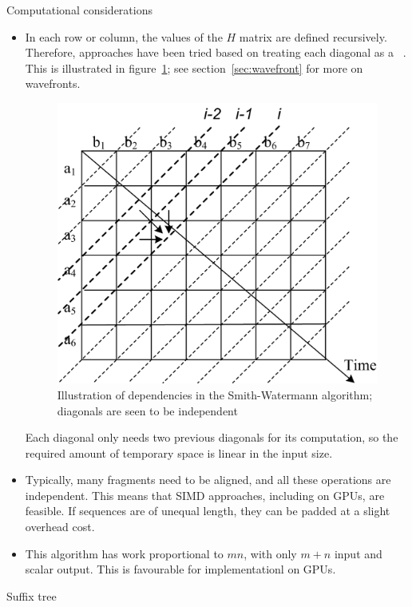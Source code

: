 Computational considerations
\begin{itemize}
\item In each row or column, the values of the $H$ matrix are defined
  recursively. Therefore, approaches have been tried based on treating
  each diagonal as a ~\cite{Liu:cudasw2009}.
  This is illustrated in figure~\ref{fig:sw-diagonal};
  see section~\ref{sec:wavefront} for more on wavefronts.
  \begin{figure}
  \includegraphics{graphics-public/smith-watermann-diagonal}
  \caption{Illustration of dependencies in the Smith-Watermann algorithm; diagonals are seen to be independent}
  \label{fig:sw-diagonal}  
  \end{figure}
  Each diagonal only needs two previous diagonals for its computation,
  so the required amount of temporary space is linear in the input size.
\item Typically, many fragments need to be aligned, and all these
  operations are independent. This means that SIMD approaches,
  including on \acp{GPU}, are feasible. If sequences are of unequal
  length, they can be padded at a slight overhead cost.
\item This algorithm has work proportional to $mn$, with only $m+n$
  input and scalar output. This is favourable for implementationl on
  \acp{GPU}.
\end{itemize}

 {Suffix tree}

